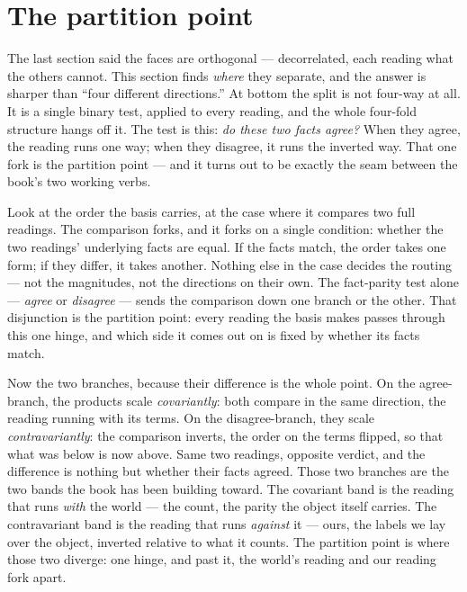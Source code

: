 \section{The partition point}

The last section said the faces are orthogonal --- decorrelated, each reading what the others cannot. This section
finds \emph{where} they separate, and the answer is sharper than ``four different directions.'' At bottom the split is
not four-way at all. It is a single binary test, applied to every reading, and the whole four-fold structure hangs off
it. The test is this: \emph{do these two facts agree?} When they agree, the reading runs one way; when they disagree,
it runs the inverted way. That one fork is the partition point --- and it turns out to be exactly the seam between the
book's two working verbs.

Look at the order the basis carries, at the case where it compares two full readings. The comparison forks, and it
forks on a single condition: whether the two readings' underlying facts are equal. If the facts match, the order takes
one form; if they differ, it takes another. Nothing else in the case decides the routing --- not the magnitudes, not
the directions on their own. The fact-parity test alone --- \emph{agree} or \emph{disagree} --- sends the comparison
down one branch or the other. That disjunction is the partition point: every reading the basis makes passes through
this one hinge, and which side it comes out on is fixed by whether its facts match.

Now the two branches, because their difference is the whole point. On the agree-branch, the products scale
\emph{covariantly}: both compare in the same direction, the reading running with its terms. On the disagree-branch,
they scale \emph{contravariantly}: the comparison inverts, the order on the terms flipped, so that what was below is
now above. Same two readings, opposite verdict, and the difference is nothing but whether their facts agreed. Those two
branches are the two bands the book has been building toward. The covariant band is the reading that runs \emph{with}
the world --- the count, the parity the object itself carries. The contravariant band is the reading that runs
\emph{against} it --- ours, the labels we lay over the object, inverted relative to what it counts. The partition point
is where those two diverge: one hinge, and past it, the world's reading and our reading fork apart.

